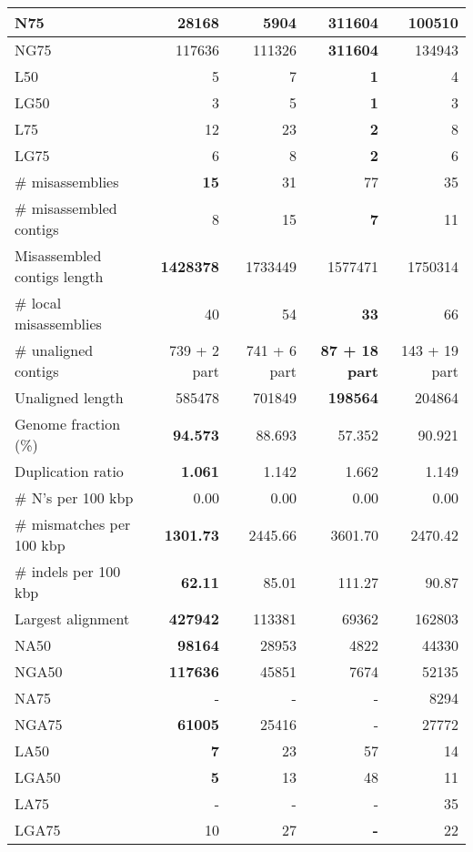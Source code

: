 \documentclass[12pt,a4paper]{article}
\begin{document}
\begin{table}[ht]
\begin{center}
\begin{tabular}{|l*{4}{|r}|}
N75 & 28168 & 5904 & {\bf 311604} & 100510 \\ \hline
NG75 & 117636 & 111326 & {\bf 311604} & 134943 \\ \hline
L50 & 5 & 7 & {\bf 1} & 4 \\ \hline
LG50 & 3 & 5 & {\bf 1} & 3 \\ \hline
L75 & 12 & 23 & {\bf 2} & 8 \\ \hline
LG75 & 6 & 8 & {\bf 2} & 6 \\ \hline
\# misassemblies & {\bf 15} & 31 & 77 & 35 \\ \hline
\# misassembled contigs & 8 & 15 & {\bf 7} & 11 \\ \hline
Misassembled contigs length & {\bf 1428378} & 1733449 & 1577471 & 1750314 \\ \hline
\# local misassemblies & 40 & 54 & {\bf 33} & 66 \\ \hline
\# unaligned contigs & 739 + 2 part & 741 + 6 part & {\bf 87 + 18 part} & 143 + 19 part \\ \hline
Unaligned length & 585478 & 701849 & {\bf 198564} & 204864 \\ \hline
Genome fraction (\%) & {\bf 94.573} & 88.693 & 57.352 & 90.921 \\ \hline
Duplication ratio & {\bf 1.061} & 1.142 & 1.662 & 1.149 \\ \hline
\# N's per 100 kbp & 0.00 & 0.00 & 0.00 & 0.00 \\ \hline
\# mismatches per 100 kbp & {\bf 1301.73} & 2445.66 & 3601.70 & 2470.42 \\ \hline
\# indels per 100 kbp & {\bf 62.11} & 85.01 & 111.27 & 90.87 \\ \hline
Largest alignment & {\bf 427942} & 113381 & 69362 & 162803 \\ \hline
NA50 & {\bf 98164} & 28953 & 4822 & 44330 \\ \hline
NGA50 & {\bf 117636} & 45851 & 7674 & 52135 \\ \hline
NA75 & - & - & - & 8294 \\ \hline
NGA75 & {\bf 61005} & 25416 & - & 27772 \\ \hline
LA50 & {\bf 7} & 23 & 57 & 14 \\ \hline
LGA50 & {\bf 5} & 13 & 48 & 11 \\ \hline
LA75 & - & - & - & 35 \\ \hline
LGA75 & 10 & 27 & {\bf -} & 22 \\ \hline
\end{tabular}
\end{center}
\end{table}
\end{document}
